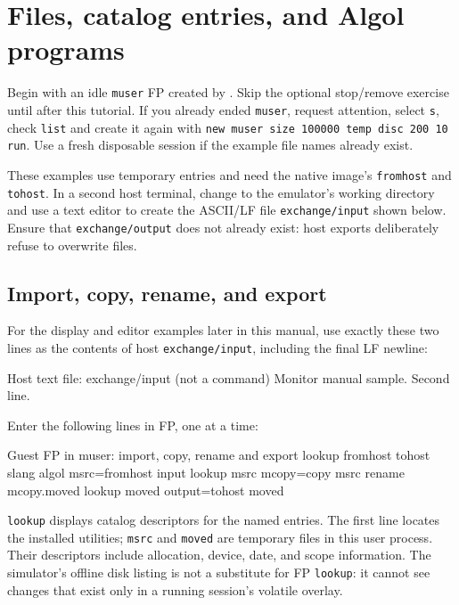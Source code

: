 \chapter{Files, catalog entries, and Algol programs}\label{files-catalog-entries-and-algol-programs}

Begin with an idle \texttt{muser} FP created by
.
Skip the optional stop/remove exercise until after this tutorial.
If you already ended \texttt{muser}, request attention, select \texttt{s},
check \texttt{list} and create it again with
\texttt{new muser size 100000 temp disc 200 10 run}.
Use a fresh disposable session if the example file names already exist.

These examples use temporary entries and need the native image's
\texttt{fromhost} and \texttt{tohost}. In a second host terminal, change to
the emulator's working directory and use a text editor to create the ASCII/LF
file \texttt{exchange/input} shown below. Ensure that \texttt{exchange/output}
does not already exist: host exports deliberately refuse to overwrite files.

\section{Import, copy, rename, and export}\label{import-copy-rename-and-export}

For the display and editor examples later in this manual, use exactly these
two lines as the contents of host \passthrough{\lstinline!exchange/input!},
including the final LF newline:

\begin{commandexample}{Host text file: exchange/input (not a command)}
Monitor manual sample.
Second line.
\end{commandexample}

Enter the following lines in FP, one at a time:

\begin{commandexample}{Guest FP in muser: import, copy, rename and export}
lookup fromhost tohost slang algol
msrc=fromhost input
lookup msrc
mcopy=copy msrc
rename mcopy.moved
lookup moved
output=tohost moved
\end{commandexample}

\passthrough{\lstinline!lookup!} displays catalog descriptors for the named entries. The first line locates the installed utilities; \passthrough{\lstinline!msrc!} and \passthrough{\lstinline!moved!} are temporary files in this user process. Their descriptors include allocation, device, date, and scope information. The simulator's offline disk listing is not a substitute for FP \passthrough{\lstinline!lookup!}: it cannot see changes that exist only in a running session's volatile overlay.

